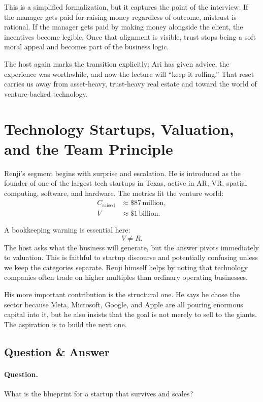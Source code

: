This is a simplified formalization, but it captures the point of the interview. If the manager gets paid for raising money regardless of outcome, mistrust is rational. If the manager gets paid by making money alongside the client, the incentives become legible. Once that alignment is visible, trust stops being a soft moral appeal and becomes part of the business logic.

The host again marks the transition explicitly: Ari has given advice, the experience was worthwhile, and now the lecture will ``keep it rolling.'' That reset carries us away from asset-heavy, trust-heavy real estate and toward the world of venture-backed technology.

\section{Technology Startups, Valuation, and the Team Principle}

Renji's segment begins with surprise and escalation. He is introduced as the founder of one of the largest tech startups in Texas, active in AR, VR, spatial computing, software, and hardware. The metrics fit the venture world:
\begin{align}
C_{\text{raised}} &\approx \$87\,\text{million},\\
V &\approx \$1\,\text{billion}.
\end{align}

A bookkeeping warning is essential here:
\begin{equation}
V \neq R.
\end{equation}
The host asks what the business will generate, but the answer pivots immediately to valuation. This is faithful to startup discourse and potentially confusing unless we keep the categories separate. Renji himself helps by noting that technology companies often trade on higher multiples than ordinary operating businesses.

His more important contribution is the structural one. He says he chose the sector because Meta, Microsoft, Google, and Apple are all pouring enormous capital into it, but he also insists that the goal is not merely to sell to the giants. The aspiration is to build the next one.

\subsection{Question \& Answer}

\paragraph{Question.} What is the blueprint for a startup that survives and scales?


